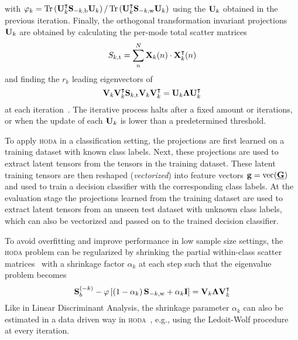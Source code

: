 \documentclass[twocolumn]{article}
\begin{document}
with $\varphi_k=\operatorname{Tr}\left(\mathbf{U}_k^\intercal\mathbf{S}_{-k,\text{b}}\mathbf{U}_k\right)/\operatorname{Tr}\left(\mathbf{U}_k^\intercal\mathbf{S}_{-k,\text{w}}\mathbf{U}_k\right)$
using the $\mathbf{U}_k$ obtained in the previous iteration.
Finally, the orthogonal transformation invariant projections $\mathbf{U}_k$
are obtained by calculating the
per-mode total scatter matrices
\begin{equation}
  S_{k,\text{t}} = \sum_n^N\mathbf{X}_k(n)\cdot\mathbf{X}_k^\intercal(n)
\end{equation}
and finding the $r_k$ leading eigenvectors of
\begin{equation}
  \mathbf{V}_k\mathbf{V}_k^\intercal\mathbf{S}_{k,\text{t}}\mathbf{V}_k\mathbf{V}_k^\intercal
  = \mathbf{U}_k\mathbf{\Lambda}\mathbf{U}_k^\intercal
\end{equation}
at each iteration~\cite{Wang2007}.
The iterative process halts after a fixed amount or iterations, or when the
update of each $\mathbf{U}_k$ is lower than a predetermined threshold.

To apply \textsc{hoda} in a classification setting, the projections
are first learned on a training dataset  with known class labels.
Next, these projections are used to extract latent tensors from the
tensors in the training dataset.
These latent training tensors are then reshaped (\emph{vectorized}) into feature vectors
$\mathbf{g} =  \operatorname{vec}(\underline{\mathbf{G}})$ and used to train a decision classifier with the corresponding class labels.
At the evaluation stage the projections learned from the training dataset are
used to extract latent tensors from an unseen test dataset with unknown class
labels, which can also be vectorized and passed on to the trained decision
classifier.

To avoid overfitting and improve performance in low sample size settings, the
\textsc{hoda} problem can be regularized by shrinking the partial
within-class scatter matrices~\cite{Phan2010} with a shrinkage factor
$\alpha_k$ at each step such that the eigenvalue problem becomes
\begin{equation}
  \mathbf{S}_b^{(-k)} -
  \varphi\left[\left(1-\alpha_k\right)\mathbf{S}_{-k,\text{w}}+\alpha_k\mathbf{I}\right] =
  \mathbf{V}_k\mathbf{\Lambda}\mathbf{V}_k^\intercal
\end{equation}
Like in Linear Discriminant Analysis, the shrinkage parameter $\alpha_k$ can
also be estimated in a data driven way in \textsc{hoda}~\cite{Jorajuria2022},
e.g., using the Ledoit-Wolf procedure~\cite{Ledoit2003} at every iteration.
\end{document}
